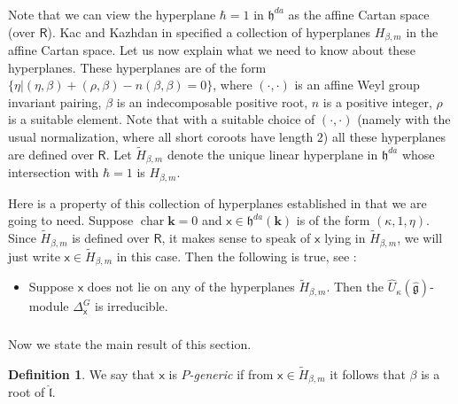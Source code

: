 \documentclass{amsart}
\theoremstyle{definition}
\newtheorem{defi}[Thm]{Definition}
\newtheorem{Rem}[Thm]{Remark}
\newcommand{\sss}{\subsubsection{}}
\newcommand{\Ring}{\mathsf{R}}
\newcommand{\g}{\mathfrak{g}}
\newcommand{\hg}{\hat{\mathfrak{g}}}
\newcommand{\h}{\mathfrak{h}}
\newcommand{\hl}{\hat{\mathfrak{l}}}
\newcommand{\bk}{\mathbf{k}}
\newcommand{\sx}{\mathsf{x}}
\numberwithin{equation}{section}
\begin{document}
\sss\label{SSS_KK_hyperplanes}  Note that we can view the hyperplane $\hbar=1$ in $\h^{da}$
as the affine Cartan space (over $\Ring$). Kac and Kazhdan in \cite{Kac_Kazhdan} specified a collection of hyperplanes $H_{\beta,m}$ in the affine Cartan space. Let us now explain what we need to know about these hyperplanes. These hyperplanes are of the form $\{\eta|(\eta,\beta)+(\rho,\beta)-n(\beta,\beta)=0\}$, where $(\cdot,\cdot)$ is an affine Weyl group invariant pairing, $\beta$ is an indecomposable positive root, $n$ is a positive integer, $\rho$ is a suitable element. Note that with a suitable choice of $(\cdot,\cdot)$ (namely with the usual normalization, where all short coroots have length $2$) all these hyperplanes are defined over $\Ring$. Let $\tilde{H}_{\beta,m}$ denote the unique linear hyperplane in $\h^{da}$ whose intersection with $\hbar=1$ is $H_{\beta,m}$. 

Here is a property of this collection of hyperplanes established in \cite{Kac_Kazhdan} that we are going to need.
Suppose $\operatorname{char}\bk=0$ and $\sx\in \h^{da}(\bk)$
is of the form $(\kappa,1,\eta)$. Since $\tilde{H}_{\beta,m}$ is defined over $\Ring$, it makes sense to speak of $\sx$ lying in  $\tilde{H}_{\beta,m}$, we will just write $\sx\in \tilde{H}_{\beta,m}$ in this case. Then the following is true, see \cite[Proposition 3.1]{Kac_Kazhdan}:
\begin{itemize}
\item[(*)] Suppose $\sx$ does not lie on any of the hyperplanes $\tilde{H}_{\beta,m}$. Then the $\widehat{U}_{\kappa}(\hg)$-module $\Delta^G_{\sx}$ is irreducible. 
\end{itemize}


\sss
Now we state the main result of this section.

\begin{defi}\label{defi:P_generic}
We say that $\sx$ is {\it $P$-generic} if from $\sx\in \tilde{H}_{\beta,m}$
it follows that $\beta$ is a root of $\hl$. 
\end{defi}
\end{document}
